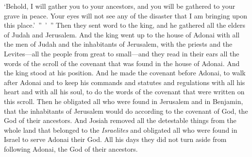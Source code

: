 \begin{biblechapter}
\verse ‘Behold, I will gather you to your ancestors, and you will be gathered to your grave in peace. Your eyes will not see any of the disaster that I am bringing upon this place.’ ” ’ ”
\verse Then they sent word to the king, and he gathered all the elders of Judah and Jerusalem.
\verse And the king went up to the house of Adonai with all the men of Judah and the inhabitants of Jerusalem, with the priests and the Levites—all the people from great to small—and they read in their ears all the words of the scroll of the covenant that was found in the house of Adonai.
\verse And the king stood at his position. And he made the covenant before Adonai, to walk after Adonai and to keep his commands and statutes and regulations with all his heart and with all his soul, to do the words of the covenant that were written on this scroll.
\verse Then he obligated all who were found in Jerusalem and in Benjamin, that the inhabitants of Jerusalem would do according to the covenant of God, the God of their ancestors.
\verse And Josiah removed all the detestable things from the whole land that belonged to the \textit{Israelites} and obligated all who were found in Israel to serve Adonai their God. All his days they did not turn aside from following Adonai, the God of their ancestors.
\end{biblechapter}

